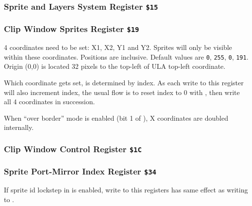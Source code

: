 \documentclass[12pt,twoside,openright,a4paper]{book}
\begin{document}
\subsubsection{Sprite and Layers System Register {\tt \$15}}



\subsubsection{Clip Window Sprites Register {\tt \$19}}

\begin{NextPort}
\end{NextPort}

4 coordinates need to be set: X1, X2, Y1 and Y2. Sprites will only be visible within these coordinates. Positions are inclusive. Default values are {\tt 0}, {\tt 255}, {\tt 0}, {\tt 191}. Origin (0,0) is located 32 pixels to the top-left of ULA top-left coordinate.

Which coordinate gets set, is determined by index. As each write to this register will also increment index, the usual flow is to reset index to 0 with , then write all 4 coordinates in succession.

When ``over border'' mode is enabled (bit 1 of ), X coordinates are doubled internally.


\subsubsection{Clip Window Control Register {\tt \$1C}}



\subsubsection{Sprite Port-Mirror Index Register {\tt \$34}}

If sprite id lockstep in  is enabled, write to this registers has same effect as writing to .

\begin{NextPort}
\end{NextPort}
\end{document}
